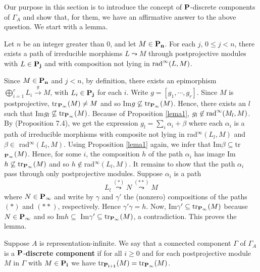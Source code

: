 Our purpose in this section is to introduce the concept of $\bf{P}$-discrete components of $\Gamma_A$ and show that, 
for them, we have an affirmative answer to the above question. We start with a lemma. 
 

\begin{lem}
\label{formadopreprojetivo}
Let $n$ be an integer greater than 0, and let $M\in {\bf P_n}$. For each $j$, $0 \leq j < n$, there exists a path of irreducible morphisms 
$L \leadsto M$ through postprojective modules with $L \in {\bf P_j}$ and with composition not lying in ${\rm rad}^{\infty}(L,M)$.
\end{lem}
\begin{pf} 
Since $M\in{\bf P_n}$ and $j <n$, by definition, there exists an epimorphism 
$\displaystyle\bigoplus_{i=1}^{r}L_i \stackrel {g}{\longrightarrow} M$, with $L_i \in {\bf P_j}$ for each $i$. Write $g=[g_1, \cdots, g_r]$. 
Since $M$ is postprojective, tr$_{\bf P_{\infty}}(M) \neq M$ and so Im$g \not\subseteq {\rm tr}_{\bf P_{\infty}}(M)$. Hence, there exists 
an $l$ such that Im$g_l \not\subseteq {\rm tr}_{\bf P_{\infty}}(M)$. Because of Proposition \ref{lema1}, $g_l \not\in {\rm rad}^{\infty} (M_l, M)$. 
By \cite{auslanderbook} (Proposition 7.4), we get the expression $g_l = 
\sum_i \alpha_i + \beta $ where each $\alpha_i$ is a path of irreducible morphisms with composite not 
lying in rad$^{\infty} (L_l, M)$ and $\beta \in$ rad$^{\infty} (L_l, M)$. Using Proposition \ref{lema1} again, we infer that 
Im$\beta \subseteq$tr$_{\bf P_{\infty}}(M)$. Hence, for some $i$, the composition $h$ of the path $\alpha_i$ has image 
Im$h\not\subseteq {\rm tr}_{\bf P_{\infty}}(M)$ and so $h \notin$rad$^{\infty} (L_l, M)$. It remains to show that the path $\alpha_i$ pass 
through only postprojective modules. Suppose $\alpha_i$ is a path 
$$ L_l \stackrel{(*)}{\leadsto} N \stackrel{(**)}{\leadsto} M$$
where $N \in {\bf P_{\infty}}$ and write by $\gamma$ and $\gamma'$  the (nonzero) compositions of the paths $(*)$ and $(**)$, respectively. 
Hence $\gamma ' \gamma = h$. Now, Im$\gamma' \subseteq {\rm tr}_{\bf P_{\infty}}(M)$ because $N\in {\bf P_{\infty}}$ and so 
Im$ h \subseteq$ Im$\gamma' \subseteq {\rm tr}_{\bf P_{\infty}}(M)$, a contradiction. This proves the lemma. 
\end{pf}

\begin{defn}
Suppose  $A$  is representation-infinite. We say that a connected component $\Gamma$ of $\Gamma_A$ is a $\bf{P}$-{\bf{discrete component}} if for all $i \geq 0$ and for each postprojective module $M$ in $\Gamma$ with $M \in \bf{P_i}$ we have ${\rm tr}_{\bf P_{i+1}}(M)={\rm tr}_{\bf P_{\infty}}(M)$.
\end{defn}


